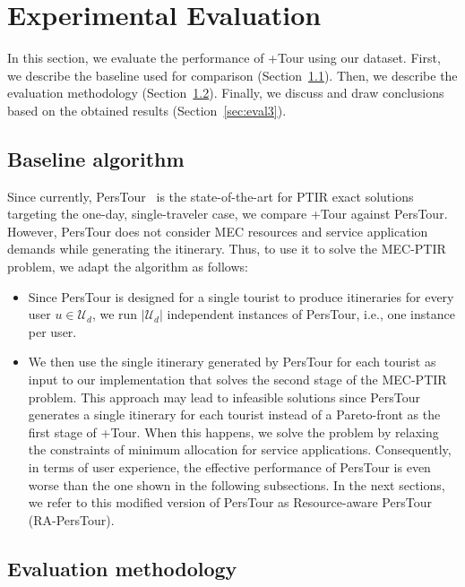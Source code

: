 \section{Experimental Evaluation}\label{sec:evaluation}

In this section, we evaluate the performance of +Tour using our dataset. First, we describe the baseline used for comparison (Section~\ref{sec:eval1}). Then, we describe the evaluation methodology (Section~\ref{sec:eval2}). Finally, we discuss and draw conclusions based on the obtained results (Section~\ref{sec:eval3}).

\subsection{Baseline algorithm}\label{sec:eval1}
Since currently, PersTour~\cite{lim-personalized:18} is the state-of-the-art for PTIR exact solutions targeting the one-day, single-traveler case, we compare +Tour against PersTour. 
However, PersTour does not consider MEC resources and service application demands while generating the itinerary. Thus, to use it to solve the MEC-PTIR problem, we adapt the algorithm as follows:

\begin{itemize}
    \item Since PersTour is designed for a single tourist to produce itineraries for every user $u \in \mathcal{U}_d$, we run $|\mathcal{U}_d|$ independent instances of PersTour, i.e., one instance per user.
    \item We then use the single itinerary generated by PersTour for each tourist as input to our implementation that solves the second stage of the MEC-PTIR problem. This approach may lead to infeasible solutions since PersTour generates a single itinerary for each tourist instead of a Pareto-front as the first {stage} of +Tour. When this happens, we solve the problem by relaxing the constraints of minimum allocation for service applications. Consequently, in terms of user experience, the effective performance of PersTour is even worse than the one shown in the following subsections. In the next sections, we refer to this modified version of PersTour as Resource-aware PersTour (RA-PersTour).
\end{itemize}

\subsection{Evaluation methodology}\label{sec:eval2}

